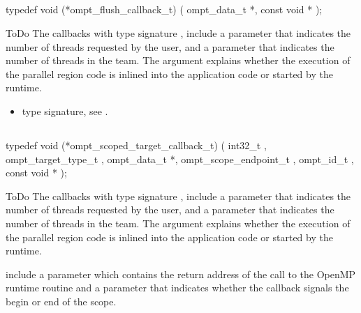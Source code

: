 \subsection{}
\label{subsec:ompt_flush_callback_t}
\format
\begin{boxedcode}
typedef void (*ompt\_flush\_callback\_t) (
  ompt\_data\_t *,
  const void *
);
\end{boxedcode}
\descr ToDo
The callbacks with type signature ,
include a parameter 
that indicates the number of threads requested by the user, and a parameter
 that indicates the number of threads in the team.
The  argument explains whether the execution of the parallel
region code is inlined into the application code or started by the runtime.

\crossreferences
\begin{itemize}
\item {} type signature, see
.
\end{itemize}



\subsection{}
\label{subsec:ompt_scoped_target_callback_t}
\format
\begin{boxedcode}
typedef void (*ompt\_scoped\_target\_callback\_t) (
  int32\_t ,
  ompt\_target\_type\_t ,
  ompt\_data\_t *,
  ompt\_scope\_endpoint\_t ,
  ompt\_id\_t ,
  const void *
);
\end{boxedcode}
\descr ToDo
The callbacks with type signature ,
include a parameter 
that indicates the number of threads requested by the user, and a parameter
 that indicates the number of threads in the team.
The  argument explains whether the execution of the parallel
region code is inlined into the application code or started by the runtime.

include a parameter  which contains the return address of the
call to the OpenMP runtime routine and a parameter 
that indicates whether the callback signals the begin or end of the scope.

